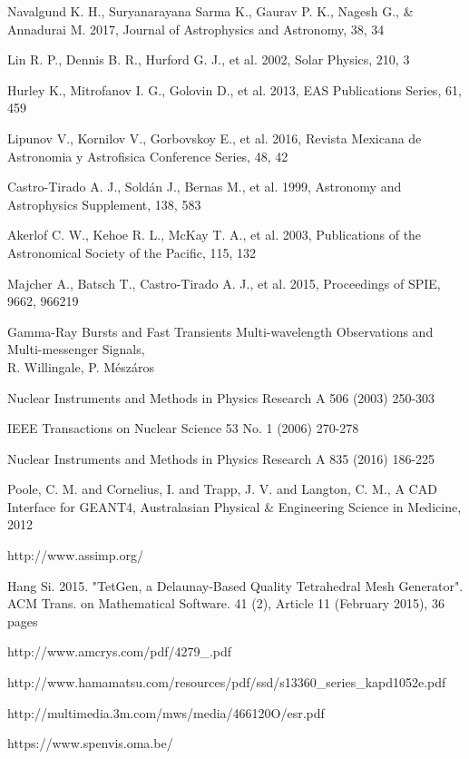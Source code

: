 \documentclass[12pt, a4paper,titlepage]{article}
\numberwithin{equation}{section}
\numberwithin{figure}{section}
\begin{document}
\begin{thebibliography}{99}
 Navalgund K. H., Suryanarayana Sarma K., Gaurav P. K., Nagesh G., \& Annadurai M. 2017, Journal of Astrophysics and Astronomy, 38, 34

 Lin R. P., Dennis B. R., Hurford G. J., et al. 2002, Solar Physics, 210, 3

 Hurley K., Mitrofanov I. G., Golovin D., et al. 2013, EAS Publications Series, 61, 459 

 Lipunov V., Kornilov V., Gorbovskoy E., et al. 2016, Revista Mexicana de Astronomia y Astrofisica
Conference Series, 48, 42

 Castro-Tirado A. J., Soldán J., Bernas M., et al. 1999, Astronomy and Astrophysics Supplement, 138, 583

 Akerlof C. W., Kehoe R. L., McKay T. A., et al. 2003, Publications of the Astronomical Society of the Pacific, 115, 132

 Majcher A., Batsch T., Castro-Tirado A. J., et al. 2015, Proceedings of SPIE, 9662, 966219

 Gamma-Ray Bursts and Fast Transients
Multi-wavelength Observations and Multi-messenger Signals,\\
R. Willingale, P. Mészáros

 Nuclear Instruments and Methods in Physics Research A 506 (2003) 250-303

 IEEE Transactions on Nuclear Science 53 No. 1 (2006) 270-278

 Nuclear Instruments and Methods in Physics Research A 835 (2016) 186-225

 Poole, C. M. and Cornelius, I. and Trapp, J. V. and Langton, C. M., A CAD Interface for GEANT4, Australasian Physical \& Engineering Science in Medicine, 2012

 http://www.assimp.org/

 Hang Si. 2015. "TetGen, a Delaunay-Based Quality Tetrahedral Mesh Generator". ACM Trans. on Mathematical Software. 41 (2), Article 11 (February 2015), 36 pages

 http://www.amcrys.com/pdf/4279\_.pdf

 http://www.hamamatsu.com/resources/pdf/ssd/s13360\_series\_kapd1052e.pdf

 http://multimedia.3m.com/mws/media/466120O/esr.pdf
 
 https://www.spenvis.oma.be/

\end{thebibliography}

\pagebreak

\listoffigures


\end{document}
